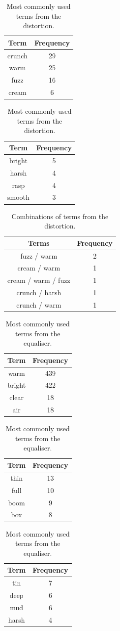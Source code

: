 		\begin{table}[h!]
			\centering
			\begin{tabular}{|c|c|}
				\hline
				\bf{Term} & \bf{Frequency} \tabularnewline
				\hline
				\hline
				crunch & 29 \tabularnewline
				\hline
				warm & 25 \tabularnewline
				\hline
				fuzz & 16 \tabularnewline
				\hline
				cream & 6 \tabularnewline
				\hline
			\end{tabular}
			\qquad
			\begin{tabular}{|c|c|}
				\hline
				\bf{Term} & \bf{Frequency} \tabularnewline
				\hline
				\hline
				bright & 5 \tabularnewline
				\hline
				harsh & 4 \tabularnewline
				\hline
				rasp & 4 \tabularnewline
				\hline
				smooth & 3 \tabularnewline
				\hline
			\end{tabular}
			\caption{Most commonly used terms from the distortion.}
			\label{tab:DistortionTerms}
		\end{table}

		\begin{table}[h!]
			\centering
			\begin{tabular}{|c|c|}
				\hline
				\bf{Terms} & \bf{Frequency} \tabularnewline
				\hline
				\hline
				fuzz / warm & 2 \tabularnewline
				\hline
				cream / warm & 1 \tabularnewline
				\hline
				cream / warm / fuzz & 1 \tabularnewline
				\hline
				crunch / harsh & 1 \tabularnewline
				\hline
				crunch / warm & 1 \tabularnewline
				\hline
			\end{tabular}
			\caption{Combinations of terms from the distortion.}
			\label{tab:DistortionTermCombinations}
		\end{table}

		\begin{table}[h!]
			\centering
			\begin{tabular}{|c|c|}
				\hline
				\bf{Term} & \bf{Frequency} \tabularnewline
				\hline
				\hline
				warm & 439 \tabularnewline
				\hline
				bright & 422 \tabularnewline
				\hline
				clear & 18 \tabularnewline
				\hline
				air & 18 \tabularnewline
				\hline
			\end{tabular}
			\qquad
			\begin{tabular}{|c|c|}
				\hline
				\bf{Term} & \bf{Frequency} \tabularnewline
				\hline
				\hline
				thin & 13 \tabularnewline
				\hline
				full & 10 \tabularnewline
				\hline
				boom & 9 \tabularnewline
				\hline
				box & 8 \tabularnewline
				\hline
			\end{tabular}
			\qquad
			\begin{tabular}{|c|c|}
				\hline
				\bf{Term} & \bf{Frequency} \tabularnewline
				\hline
				\hline
				tin & 7 \tabularnewline
				\hline
				deep & 6 \tabularnewline
				\hline
				mud & 6 \tabularnewline
				\hline
				harsh & 4 \tabularnewline
				\hline
			\end{tabular}
			\caption{Most commonly used terms from the equaliser.}
			\label{tab:EqualiserTerms}
		\end{table}

